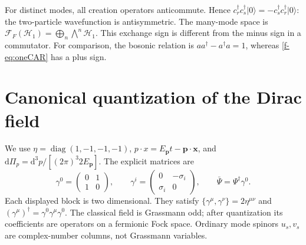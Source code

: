 \documentclass[11pt]{article}
\newcommand{\dd}{\mathrm{d}}
\newcommand{\cH}{\mathcal H}
\newcommand{\diag}{\operatorname{diag}}
\newcommand{\vac}{\lvert0\rangle}
\begin{document}
For distinct modes, all creation operators anticommute. Hence
\(c_r^\dagger c_s^\dagger\vac=-c_s^\dagger c_r^\dagger\vac\): the two-particle
wavefunction is antisymmetric. The many-mode space is
\(\mathcal F_F(\cH_1)=\bigoplus_n\bigwedge^n\cH_1\).
This exchange sign is different from the minus sign in a commutator.
For comparison, the bosonic relation is \(aa^\dagger-a^\dagger a=1\),
whereas \eqref{f-eq:oneCAR} has a plus sign.

\section{Canonical quantization of the Dirac field}
\begin{keyidea}
We use \(\eta=\diag(1,-1,-1,-1)\), \(p\cdot x=E_{\bm p}t-\bm p\cdot\bm x\),
and \(\dd\Pi_p=\dd^3p/[(2\pi)^3 2E_{\bm p}]\). The explicit matrices are
\[
 \gamma^0=\begin{pmatrix}0&1\\1&0\end{pmatrix},\qquad
 \gamma^i=\begin{pmatrix}0&-\sigma_i\\\sigma_i&0\end{pmatrix},\qquad
 \bar\Psi=\Psi^\dagger\gamma^0.
\]
Each displayed block is two dimensional. They satisfy
\(\{\gamma^\mu,\gamma^\nu\}=2\eta^{\mu\nu}\) and
\((\gamma^\mu)^\dagger=\gamma^0\gamma^\mu\gamma^0\).
The classical field is Grassmann odd; after quantization its coefficients
are operators on a fermionic Fock space. Ordinary mode spinors \(u_s,v_s\)
are complex-number columns, not Grassmann variables.
\end{keyidea}
\end{document}
